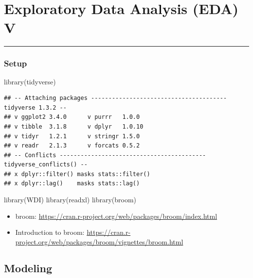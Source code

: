 \documentclass[
]{article}
\newenvironment{Shaded}{\begin{snugshade}}{\end{snugshade}}
\newcommand{\FunctionTok}[1]{\textcolor[rgb]{0.00,0.00,0.00}{#1}}
\newcommand{\NormalTok}[1]{#1}
\providecommand{\tightlist}{%
  \setlength{\itemsep}{0pt}\setlength{\parskip}{0pt}}
\begin{document}
\hypertarget{exploratory-data-analysis-eda-v}{%
\section{Exploratory Data Analysis (EDA)
V}\label{exploratory-data-analysis-eda-v}}

\begin{center}\rule{0.5\linewidth}{0.5pt}\end{center}

\hypertarget{setup}{%
\subsubsection*{Setup}\label{setup}}

\begin{Shaded}
\begin{Highlighting}[]
\FunctionTok{library}\NormalTok{(tidyverse)}
\end{Highlighting}
\end{Shaded}

\begin{verbatim}
## -- Attaching packages --------------------------------------- tidyverse 1.3.2 --
## v ggplot2 3.4.0      v purrr   1.0.0 
## v tibble  3.1.8      v dplyr   1.0.10
## v tidyr   1.2.1      v stringr 1.5.0 
## v readr   2.1.3      v forcats 0.5.2 
## -- Conflicts ------------------------------------------ tidyverse_conflicts() --
## x dplyr::filter() masks stats::filter()
## x dplyr::lag()    masks stats::lag()
\end{verbatim}

\begin{Shaded}
\begin{Highlighting}[]
\FunctionTok{library}\NormalTok{(WDI)}
\FunctionTok{library}\NormalTok{(readxl)}
\FunctionTok{library}\NormalTok{(broom)}
\end{Highlighting}
\end{Shaded}

\begin{itemize}
\tightlist
\item
  broom: \url{https://cran.r-project.org/web/packages/broom/index.html}
\item
  Introduction to broom:
  \url{https://cran.r-project.org/web/packages/broom/vignettes/broom.html}
\end{itemize}

\hypertarget{modeling}{%
\subsection{Modeling}\label{modeling}}
\end{document}
